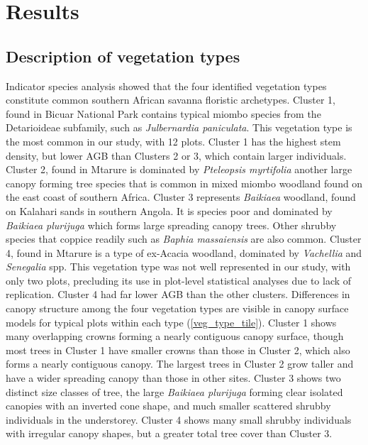 \documentclass[11pt,a4paper]{article}
\begin{document}




\section{Results}

\subsection{Description of vegetation types}

Indicator species analysis showed that the four identified vegetation types constitute common southern African savanna floristic archetypes. Cluster 1, found in Bicuar National Park contains typical miombo species from the Detarioideae subfamily, such as \textit{Julbernardia paniculata}. This vegetation type is the most common in our study, with 12 plots. Cluster 1 has the highest stem density, but lower AGB than Clusters 2 or 3, which contain larger individuals. Cluster 2, found in Mtarure is dominated by \textit{Pteleopsis myrtifolia} another large canopy forming tree species that is common in mixed miombo woodland found on the east coast of southern Africa. Cluster 3 represents \textit{Baikiaea} woodland, found on Kalahari sands in southern Angola. It is species poor and dominated by \textit{Baikiaea plurijuga} which forms large spreading canopy trees. Other shrubby species that coppice readily such as \textit{Baphia massaiensis} are also common. Cluster 4, found in Mtarure is a type of ex-Acacia woodland, dominated by \textit{Vachellia} and \textit{Senegalia} spp. This vegetation type was not well represented in our study, with only two plots, precluding its use in plot-level statistical analyses due to lack of replication. Cluster 4 had far lower AGB than the other clusters. Differences in canopy structure among the four vegetation types are visible in canopy surface models for typical plots within each type (\autoref{veg_type_tile}). Cluster 1 shows many overlapping crowns forming a nearly contiguous canopy surface, though most trees in Cluster 1 have smaller crowns than those in Cluster 2, which also forms a nearly contiguous canopy. The largest trees in Cluster 2 grow taller and have a wider spreading canopy than those in other sites. Cluster 3 shows two distinct size classes of tree, the large \textit{Baikiaea plurijuga} forming clear isolated canopies with an inverted cone shape, and much smaller scattered shrubby individuals in the understorey. Cluster 4 shows many small shrubby individuals with irregular canopy shapes, but a greater total tree cover than Cluster 3. 
\end{document}
